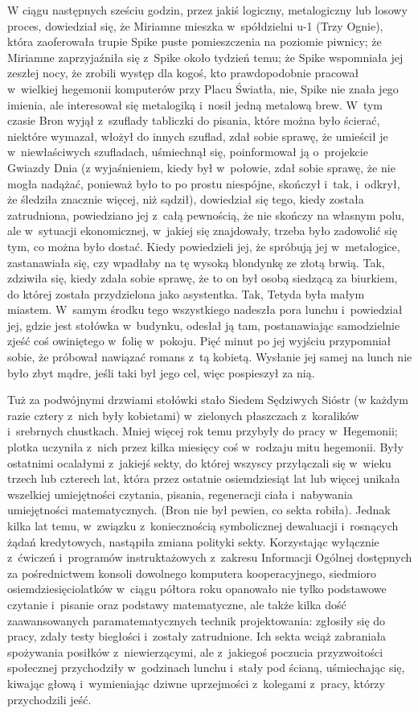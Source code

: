 \documentclass[oneside,polish,11pt,rmheadings]{mwbk}
\begin{document}
W ciągu następnych sześciu godzin, przez jakiś logiczny, metalogiczny lub losowy proces, dowiedział się, że Miriamne mieszka w~spółdzielni u-1 (Trzy Ognie), która zaoferowała trupie Spike puste pomieszczenia na poziomie piwnicy; że Miriamne zaprzyjaźniła się z~Spike około tydzień temu; że Spike wspomniała jej zeszłej nocy, że zrobili występ dla kogoś, kto prawdopodobnie pracował w~wielkiej hegemonii komputerów przy Placu Światła, nie, Spike nie znała jego imienia, ale interesował się metalogiką i~nosił jedną metalową brew.  W~tym czasie Bron wyjął z~szuflady tabliczki do pisania, które można było ścierać, niektóre wymazał, włożył do innych szuflad, zdał sobie sprawę, że umieścił je w~niewłaściwych szufladach, uśmiechnął się, poinformował ją o~projekcie Gwiazdy Dnia (z wyjaśnieniem, kiedy był w~połowie, zdał sobie sprawę, że nie mogła nadążać, ponieważ było to po prostu niespójne, skończył i~tak, i~odkrył, że śledziła znacznie więcej, niż sądził), dowiedział się tego, kiedy została zatrudniona, powiedziano jej z~całą pewnością, że nie skończy na własnym polu, ale w~sytuacji ekonomicznej, w~jakiej się znajdowały, trzeba było zadowolić się tym, co można było dostać. Kiedy powiedzieli jej, że spróbują jej w~metalogice, zastanawiała się, czy wpadłaby na tę wysoką blondynkę ze złotą brwią. Tak, zdziwiła się, kiedy zdała sobie sprawę, że to on był osobą siedzącą za biurkiem, do której została przydzielona jako asystentka. Tak, Tetyda była małym miastem. W~samym środku tego wszystkiego nadeszła pora lunchu i~powiedział jej, gdzie jest stołówka w~budynku, odesłał ją tam, postanawiając samodzielnie zjeść coś owiniętego w~folię w~pokoju. Pięć minut po jej wyjściu przypomniał sobie, że próbował nawiązać romans z~tą kobietą. Wysłanie jej samej na lunch nie było zbyt mądre, jeśli taki był jego cel, więc pospieszył za nią. 

Tuż za podwójnymi drzwiami stołówki stało Siedem Sędziwych Sióstr (w każdym razie cztery z~nich były kobietami) w~zielonych płaszczach z~koralików i~srebrnych chustkach. Mniej więcej rok temu przybyły do pracy w~Hegemonii; plotka uczyniła z~nich przez kilka miesięcy coś w~rodzaju mitu hegemonii. Były ostatnimi ocalałymi z~jakiejś sekty, do której wszyscy przyłączali się w~wieku trzech lub czterech lat, która przez ostatnie osiemdziesiąt lat lub więcej unikała wszelkiej umiejętności czytania, pisania, regeneracji ciała i~nabywania umiejętności matematycznych. (Bron nie był pewien, co sekta robiła). Jednak kilka lat temu, w~związku z~koniecznością symbolicznej dewaluacji i~rosnących żądań kredytowych, nastąpiła zmiana polityki sekty. Korzystając wyłącznie z~ćwiczeń i~programów instruktażowych z~zakresu Informacji Ogólnej dostępnych za pośrednictwem konsoli dowolnego komputera kooperacyjnego, siedmioro osiemdziesięciolatków w~ciągu półtora roku opanowało nie tylko podstawowe czytanie i~pisanie oraz podstawy matematyczne, ale także kilka dość zaawansowanych paramatematycznych technik projektowania: zgłosiły się do pracy, zdały testy biegłości i~zostały zatrudnione. Ich sekta wciąż zabraniała spożywania posiłków z~niewierzącymi, ale z~jakiegoś poczucia przyzwoitości społecznej przychodziły w~godzinach lunchu i~stały pod ścianą, uśmiechając się, kiwając głową i~wymieniając dziwne uprzejmości z~kolegami z~pracy, którzy przychodzili jeść. 
\end{document}
